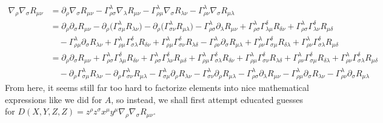 \documentclass[a4paper,11pt]{article}
\begin{document}
\begin{align*}
    \nabla_\rho \nabla_\sigma R_{\mu\nu} &=
    \partial_\rho \nabla_\sigma R_{\mu\nu}
    - \Gamma_{\rho\sigma}^\lambda \nabla_\lambda R_{\mu\nu}
    - \Gamma_{\rho\mu}^\lambda \nabla_\sigma R_{\lambda\nu}
    - \Gamma_{\rho\nu}^\lambda \nabla_\sigma R_{\mu\lambda}\\
    &=\partial_\rho \partial_\sigma R_{\mu\nu}
    - \partial_\rho\big( \Gamma_{\sigma\mu}^\lambda R_{\lambda\nu} \big)
    - \partial_\rho \big( \Gamma_{\sigma\nu}^\lambda R_{\mu\lambda} \big)
    - \Gamma_{\rho\sigma}^\lambda \partial_\lambda R_{\mu\nu}
    + \Gamma_{\rho\sigma}^\lambda \Gamma_{\lambda\mu}^\delta R_{\delta\nu}
    + \Gamma_{\rho\sigma}^\lambda \Gamma_{\lambda\nu}^\delta R_{\mu\delta}\\
    &\quad- \Gamma_{\rho\mu}^\lambda \partial_\sigma R_{\lambda\nu}
    + \Gamma_{\rho\mu}^\lambda \Gamma_{\sigma\lambda}^\delta R_{\delta\nu}
    + \Gamma_{\rho\mu}^\lambda \Gamma_{\sigma\nu}^\delta R_{\lambda\delta}
    - \Gamma_{\rho\nu}^\lambda \partial_\sigma R_{\mu\lambda}
    + \Gamma_{\rho\nu}^\lambda \Gamma_{\sigma\mu}^\delta R_{\delta\lambda}
    + \Gamma_{\rho\nu}^\lambda \Gamma_{\sigma\lambda}^\delta R_{\mu\delta}\\
    &=\partial_\rho \partial_\sigma R_{\mu\nu}
    + \Gamma_{\rho\sigma}^\lambda \Gamma_{\lambda\mu}^\delta R_{\delta\nu}
    + \Gamma_{\rho\sigma}^\lambda \Gamma_{\lambda\nu}^\delta R_{\mu\delta}
    + \Gamma_{\rho\mu}^\lambda \Gamma_{\sigma\lambda}^\delta R_{\delta\nu}
    + \Gamma_{\rho\mu}^\lambda \Gamma_{\sigma\nu}^\delta R_{\lambda\delta}
    + \Gamma_{\rho\nu}^\lambda \Gamma_{\sigma\mu}^\delta R_{\delta\lambda}
    + \Gamma_{\rho\nu}^\lambda \Gamma_{\sigma\lambda}^\delta R_{\mu\delta}\\
    &\quad - \partial_\rho \Gamma_{\sigma\mu}^\lambda R_{\lambda\nu}
    - \partial_\rho \Gamma_{\sigma\nu}^\lambda R_{\mu\lambda}
    - \Gamma_{\sigma\mu}^\lambda \partial_\rho R_{\lambda\nu}
    - \Gamma_{\sigma\nu}^\lambda \partial_\rho R_{\mu\lambda}
    - \Gamma_{\rho\sigma}^\lambda \partial_\lambda R_{\mu\nu}
    - \Gamma_{\rho\mu}^\lambda \partial_\sigma R_{\lambda\nu}
    - \Gamma_{\rho\nu}^\lambda \partial_\sigma R_{\mu\lambda}
\end{align*}
From here, it seems still far too hard to factorize elements into nice mathematical expressions like we did for $A$, so instead, we shall first attempt educated guesses for $D(X,Y,Z,Z)=z^\rho z^\sigma x^\mu y^\mu \nabla_\rho \nabla_\sigma R_{\mu\nu}$.
\end{document}
